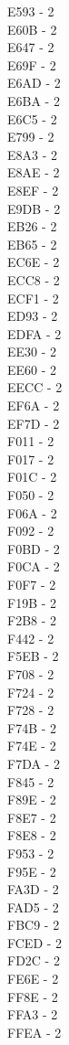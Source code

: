 \documentclass[10pt,letterpaper]{article}
\begin{document}
\begin{multicols}{5}
E593 -  2\\
E60B -  2\\
E647 -  2\\
E69F -  2\\
E6AD -  2\\
E6BA -  2\\
E6C5 -  2\\
E799 -  2\\
E8A3 -  2\\
E8AE -  2\\
E8EF -  2\\
E9DB -  2\\
EB26 -  2\\
EB65 -  2\\
EC6E -  2\\
ECC8 -  2\\
ECF1 -  2\\
ED93 -  2\\
EDFA -  2\\
EE30 -  2\\
EE60 -  2\\
EECC -  2\\
EF6A -  2\\
EF7D -  2\\
F011 -  2\\
F017 -  2\\
F01C -  2\\
F050 -  2\\
F06A -  2\\
F092 -  2\\
F0BD -  2\\
F0CA -  2\\
F0F7 -  2\\
F19B -  2\\
F2B8 -  2\\
F442 -  2\\
F5EB -  2\\
F708 -  2\\
F724 -  2\\
F728 -  2\\
F74B -  2\\
F74E -  2\\
F7DA -  2\\
F845 -  2\\
F89E -  2\\
F8E7 -  2\\
F8E8 -  2\\
F953 -  2\\
F95E -  2\\
FA3D -  2\\
FAD5 -  2\\
FBC9 -  2\\
FCED -  2\\
FD2C -  2\\
FE6E -  2\\
FF8E -  2\\
FFA3 -  2\\
FFEA -  2\\

\end{multicols}
\end{document}
